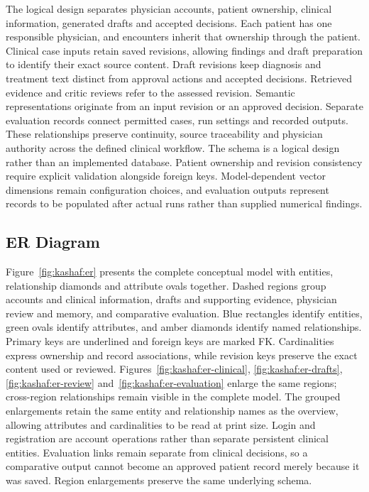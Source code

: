 The logical design separates physician accounts, patient ownership, clinical information, generated drafts and accepted decisions. Each patient has one responsible physician, and encounters inherit that ownership through the patient. Clinical case inputs retain saved revisions, allowing findings and draft preparation to identify their exact source content. Draft revisions keep diagnosis and treatment text distinct from approval actions and accepted decisions. Retrieved evidence and critic reviews refer to the assessed revision. Semantic representations originate from an input revision or an approved decision. Separate evaluation records connect permitted cases, run settings and recorded outputs. These relationships preserve continuity, source traceability and physician authority across the defined clinical workflow. The schema is a logical design rather than an implemented database. Patient ownership and revision consistency require explicit validation alongside foreign keys. Model-dependent vector dimensions remain configuration choices, and evaluation outputs represent records to be populated after actual runs rather than supplied numerical findings.

\subsection{ER Diagram}

Figure~\ref{fig:kashaf:er} presents the complete conceptual model with entities, relationship diamonds and attribute ovals together. Dashed regions group accounts and clinical information, drafts and supporting evidence, physician review and memory, and comparative evaluation. Blue rectangles identify entities, green ovals identify attributes, and amber diamonds identify named relationships. Primary keys are underlined and foreign keys are marked FK. Cardinalities express ownership and record associations, while revision keys preserve the exact content used or reviewed. Figures~\ref{fig:kashaf:er-clinical}, \ref{fig:kashaf:er-drafts}, \ref{fig:kashaf:er-review} and~\ref{fig:kashaf:er-evaluation} enlarge the same regions; cross-region relationships remain visible in the complete model. The grouped enlargements retain the same entity and relationship names as the overview, allowing attributes and cardinalities to be read at print size. Login and registration are account operations rather than separate persistent clinical entities. Evaluation links remain separate from clinical decisions, so a comparative output cannot become an approved patient record merely because it was saved. Region enlargements preserve the same underlying schema.

